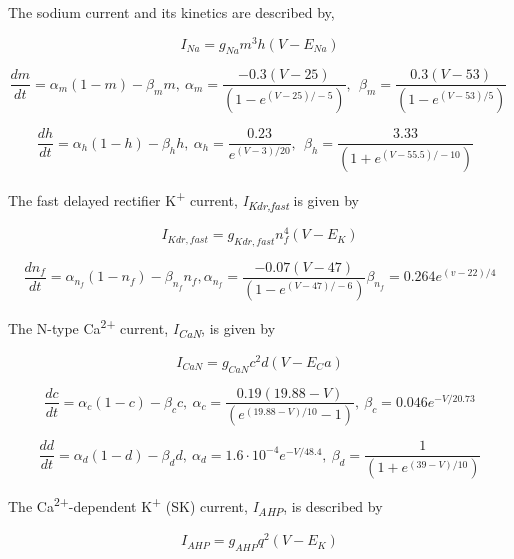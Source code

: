 \documentclass[a4paper]{article}
\begin{document}
The sodium current and its kinetics are described by,


\begin{equation}
I_{Na}=g_{Na} m^3 h (V-E_{Na})
\end{equation}

\begin{equation}
\frac{dm}{dt}=α_m(1-m)-β_mm, \ 
α_m=\frac{-0.3(V-25)}{(1-e^{(V-25)/-5})}, \ \  β_m=\frac{0.3(V-53)}{(1-e^{(V-53)/5})} \ 
\end{equation}

\begin{equation}
\frac{dh}{dt}=α_h(1-h)-β_hh, \ 
α_h=\frac{0.23}{e^{(V-3)/20}}, \ \  β_h=\frac{3.33}{(1+e^{(V-55.5)/-10})}\ \ \ 
\end{equation}


The fast delayed rectifier K\textsuperscript{+} current, \textit{I}\textit{\textsubscript{Kdr,fast}} is given by\ \ 


\begin{equation}
I_{Kdr, fast}=g_{Kdr, fast}n_f^4(V-E_K)
\end{equation}

\begin{equation}
\frac{dn_f}{dt}=α_{n_f}(1-n_f)-β_{n_f}n_f , 
α_{n_f}=\frac{-0.07(V-47)}{(1-e^{(V-47)/-6})}  β_{n_f}=0.264e^{(v-22)/4}
\end{equation}


The N-type Ca\textsuperscript{2+} current, \textit{I}\textit{\textsubscript{CaN}}, is given by


\begin{equation}
I_{CaN}=g_{CaN}c^2d(V-E_Ca)
\end{equation}

\begin{equation}
\frac{dc}{dt}=α_c(1-c)-β_cc , \ 
α_c=\frac{0.19(19.88-V)}{(e^{(19.88-V)/10}-1)}, \  β_c=0.046e^{-V/20.73}
\end{equation}

\begin{equation}
\frac{dd}{dt} = α_d(1-d)-β_dd , \ α_d=1.6\cdot
10^{-4}e^{-V/48.4} , \  β_d=\frac 1{(1+e^{(39-V)/10})}
\end{equation}


The Ca\textsuperscript{2+}-dependent K\textsuperscript{+} (SK) current, \textit{I}\textit{\textsubscript{AHP}}, is
described by


\begin{equation}
I_{AHP} = g_{AHP} q^2 (V-E_K)
\end{equation}
\end{document}
